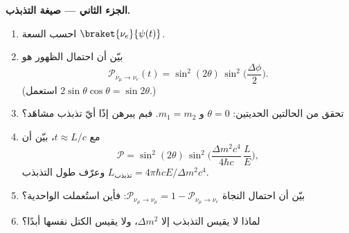\begin{problem}
\medskip\noindent\textbf{الجزء الثاني --- صيغة التذبذب.}
\begin{enumerate}[resume]
  \item احسب السعة $\braket{\nu_e}{\psi(t)}$.
  \item بيّن أن احتمال الظهور هو
        \[
        \mathcal P_{\nu_\mu \to \nu_e}(t) =
        \sin^2(2\theta)\,\sin^2\Big(\frac{\Delta\phi}{2}\Big) .
        \]
        (استعمل $2\sin\theta\cos\theta = \sin2\theta$.)
  \item تحقق من الحالتين الحديتين: $\theta = 0$ و $m_1 = m_2$.
        فبم يبرهن إذًا أيّ تذبذب مشاهَد؟
  \item مع $t \approx L/c$، بيّن أن
        \[
        \mathcal P = \sin^2(2\theta)\,
        \sin^2\Big(\frac{\Delta m^2c^4}{4\hbar c}\,\frac{L}{E}\Big) ,
        \]
        وعرّف طول التذبذب $L_{\text{تذبذب}} =
        4\pi\hbar cE/\Delta m^2c^4$.
  \item بيّن أن احتمال النجاة $\mathcal P_{\nu_\mu \to
        \nu_\mu} = 1 - \mathcal P_{\nu_\mu\to\nu_e}$: فأين
        استُعملت الواحدية؟
  \item لماذا لا يقيس التذبذب إلا $\Delta m^2$، ولا يقيس
        الكتل نفسها أبدًا؟
\end{enumerate}


\end{problem}
